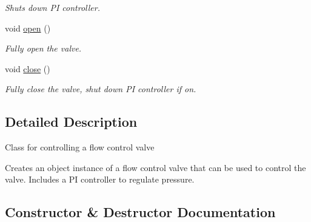 \begin{DoxyCompactItemize}
\begin{DoxyCompactList}\small\item\em Shuts down PI controller. \end{DoxyCompactList}\item 
\mbox{\label{class_a_s_e6030_1_1_flow_control_valve_a12db565b5451a4a7ee1e13ac7f031d00}} 
void \hyperlink{class_a_s_e6030_1_1_flow_control_valve_a12db565b5451a4a7ee1e13ac7f031d00}{open} ()
\begin{DoxyCompactList}\small\item\em Fully open the valve. \end{DoxyCompactList}\item 
\mbox{\label{class_a_s_e6030_1_1_flow_control_valve_a4b22d19ca0ed6eb60f31705f2ee36dd7}} 
void \hyperlink{class_a_s_e6030_1_1_flow_control_valve_a4b22d19ca0ed6eb60f31705f2ee36dd7}{close} ()
\begin{DoxyCompactList}\small\item\em Fully close the valve, shut down PI controller if on. \end{DoxyCompactList}\end{DoxyCompactItemize}


\subsection{Detailed Description}
Class for controlling a flow control valve 

Creates an object instance of a flow control valve that can be used to control the valve. Includes a PI controller to regulate pressure. 

\subsection{Constructor \& Destructor Documentation}
\mbox{\label{class_a_s_e6030_1_1_flow_control_valve_a30ba36af47913e18552ee88461ad70b7}} 
